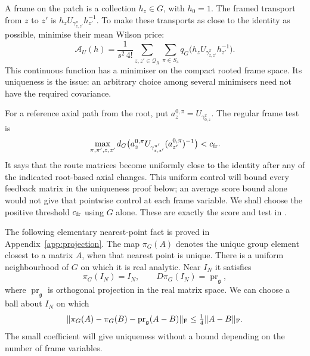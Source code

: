 \documentclass[11pt,reqno]{amsart}
\numberwithin{equation}{section}
\theoremstyle{definition}
\theoremstyle{remark}
\newcommand{\g}{\mathfrak g}
\begin{document}
A frame on the patch is a collection \(h_z\in G\), with \(h_0=1\).
The framed transport from \(z\) to \(z'\) is
\(h_zU_{\gamma^\pi_{z,z'}}h_{z'}^{-1}\).
To make these transports as close to the identity as possible,
minimise their mean Wilson price:
\begin{equation}
 \mathcal A_U(h)=\frac1{s^2\,4!}
       \sum_{z,z'\in\mathcal Q_R}\sum_{\pi\in S_4}
       q_G\bigl(h_zU_{\gamma^\pi_{z,z'}}h_{z'}^{-1}\bigr).
 \label{eq:actual-frame-score}
\end{equation}
This continuous function has a minimiser on the compact rooted
frame space. Its uniqueness is the issue: an arbitrary choice
among several minimisers need not have the required covariance.

For a reference axial path from the root, put
\(a_z^{0,\pi}=U_{\gamma^\pi_{0,z}}\). The regular frame test is
\begin{equation}
 \max_{\pi,\pi',z,z'}
       d_G\bigl(a_z^{0,\pi}U_{\gamma^{\pi'}_{z,z'}}
                              (a_{z'}^{0,\pi})^{-1}\bigr)<c_{\rm fr}.
 \label{eq:regular-frame-test}
\end{equation}
It says that the route matrices become uniformly close to the
identity after any of the indicated root-based axial changes.
This uniform control will bound every feedback matrix in the
uniqueness proof below; an average score bound alone would not
give that pointwise control at each frame variable.
We shall choose the positive threshold \(c_{\rm fr}\) using \(G\)
alone. These are exactly the score and test in
\cite[(14.2) and (14.4), p.~56]{Main}.

The following elementary nearest-point fact is proved in
Appendix~\ref{app:projection}. The map \(\pi_G(A)\) denotes the
unique group element closest to a matrix \(A\), when that nearest
point is unique. There is a uniform neighbourhood of \(G\) on
which it is real analytic. Near \(I_N\) it satisfies
\begin{equation}
 \pi_G(I_N)=I_N,\qquad D\pi_G(I_N)=\operatorname{pr}_{\g},
 \label{eq:projection-derivative}
\end{equation}
where \(\operatorname{pr}_{\g}\) is orthogonal projection in the
real matrix space. We can choose a ball about \(I_N\) on which
\begin{equation}
 \|\pi_G(A)-\pi_G(B)-\operatorname{pr}_{\g}(A-B)\|_{\rm F}
                              \le\tfrac14\|A-B\|_{\rm F}.
 \label{eq:projection-small-variation}
\end{equation}
The small coefficient will give uniqueness without a bound
depending on the number of frame variables.
\end{document}
